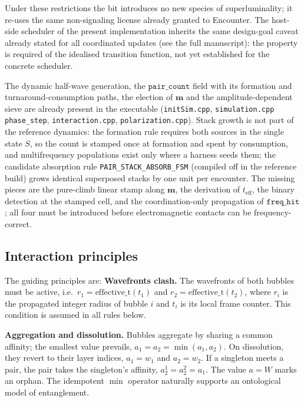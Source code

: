 \documentclass[a4paper]{article}
\begin{document}
Under these restrictions the bit introduces no new species of superluminality; it re-uses the same non-signaling license already granted to Encounter. The host-side scheduler of the present implementation inherits the same design-goal caveat already stated for all coordinated updates (see the full manuscript): the property is required of the idealised transition function, not yet established for the concrete scheduler.

The dynamic half-wave generation, the $\texttt{pair\_count}$ field with its formation and turnaround-consumption paths, the election of $\boldsymbol{m}$ and the amplitude-dependent sieve are already present in the executable (\texttt{initSim.cpp}, \texttt{simulation.cpp} \texttt{phase\_step}, \texttt{interaction.cpp}, \texttt{polarization.cpp}). Stack growth is not part of the reference dynamics: the formation rule requires both sources in the single state $S$, so the count is stamped once at formation and spent by consumption, and multifrequency populations exist only where a harness seeds them; the candidate absorption rule \texttt{PAIR\_STACK\_ABSORB\_FSM} (compiled off in the reference build) grows identical superposed stacks by one unit per encounter. The missing pieces are the pure-climb linear stamp along $\boldsymbol{m}$, the derivation of $t_{\mathrm{eff}}$, the binary detection at the stamped cell, and the coordination-only propagation of $\texttt{freq\_hit}$; all four must be introduced before electromagnetic contacts can be frequency-correct.

\subsection{Interaction principles}
The guiding principles are:
\medskip\noindent\textbf{Wavefronts clash.} The wavefronts of both bubbles must be active, i.e.\ $r_1 = \mathrm{effective\_t}(t_1)$ and $r_2 = \mathrm{effective\_t}(t_2)$, where $r_i$ is the propagated integer radius of bubble $i$ and $t_i$ is its local frame counter. This condition is assumed in all rules below.

\medskip\noindent\textbf{Aggregation and dissolution.}\label{subsec-role-of-affinity} Bubbles aggregate by sharing a common affinity; the smallest value prevails, $a_1=a_2=\min(a_1,a_2)$. On dissolution, they revert to their layer indices, $a_1=w_1$ and $a_2=w_2$. If a singleton meets a pair, the pair takes the singleton's affinity, $a_2^1=a_2^2=a_1$. The value $a=W$ marks an orphan. The idempotent $\min$ operator naturally supports an ontological model of entanglement.
\end{document}
